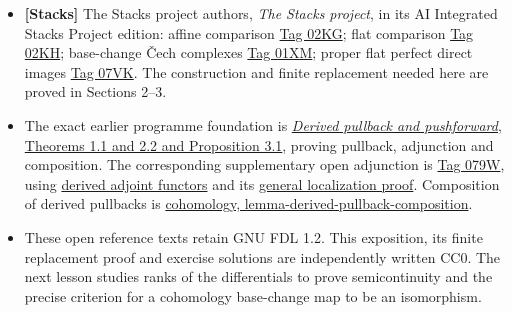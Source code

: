 \documentclass[11pt]{article}
\providecommand{\tightlist}{\setlength{\itemsep}{0pt}\setlength{\parskip}{0pt}}
\begin{document}
\begin{itemize}
\tightlist
\item
  \textbf{{[}Stacks{]}} The Stacks project authors, \emph{The Stacks
  project}, in its AI Integrated Stacks Project edition: affine
  comparison
  \href{https://kokunoyumeto.github.io/stacks-zh-hans-cn/en/coherent.html\#coherent-lemma-affine-base-change}{Tag
  02KG}; flat comparison
  \href{https://kokunoyumeto.github.io/stacks-zh-hans-cn/en/coherent.html\#coherent-lemma-flat-base-change-cohomology}{Tag
  02KH}; base-change Čech complexes
  \href{https://kokunoyumeto.github.io/stacks-zh-hans-cn/en/coherent.html\#coherent-lemma-base-change-complex}{Tag
  01XM}; proper flat perfect direct images
  \href{https://kokunoyumeto.github.io/stacks-zh-hans-cn/en/coherent.html\#coherent-lemma-perfect-direct-image}{Tag
  07VK}. The construction and finite replacement needed here are proved
  in Sections 2--3.
\item
  The exact earlier programme foundation is
  \href{../derived-categories-and-sheaf-operations/derived-pullback-and-pushforward.html}{\emph{Derived
  pullback and pushforward}, Theorems 1.1 and 2.2 and Proposition 3.1},
  proving pullback, adjunction and composition. The corresponding
  supplementary open adjunction is
  \href{https://kokunoyumeto.github.io/stacks-zh-hans-cn/en/cohomology.html\#cohomology-lemma-adjoint}{Tag
  079W}, using
  \href{https://kokunoyumeto.github.io/stacks-zh-hans-cn/en/derived.html\#derived-lemma-derived-adjoint-functors}{derived
  adjoint functors} and its
  \href{https://kokunoyumeto.github.io/stacks-zh-hans-cn/en/derived.html\#derived-lemma-pre-derived-adjoint-functors-general}{general
  localization proof}. Composition of derived pullbacks is
  \href{https://kokunoyumeto.github.io/stacks-zh-hans-cn/en/cohomology.html\#cohomology-lemma-derived-pullback-composition}{cohomology,
  lemma-derived-pullback-composition}.
\item
  These open reference texts retain GNU FDL 1.2. This exposition, its
  finite replacement proof and exercise solutions are independently
  written CC0. The next lesson studies ranks of the differentials to
  prove semicontinuity and the precise criterion for a cohomology
  base-change map to be an isomorphism.
\end{itemize}
\end{document}
